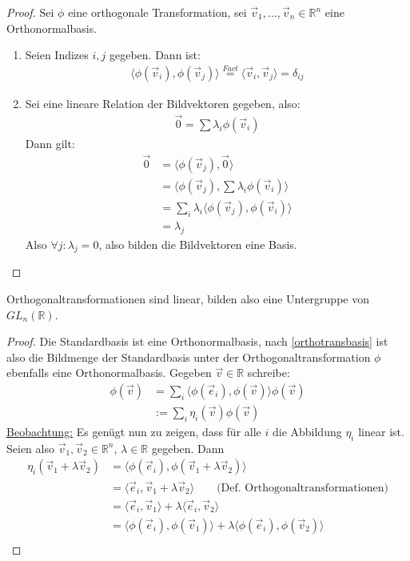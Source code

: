 \documentclass{report}
\newcommand{\ul}[1]{\underline{#1}}
\newcommand{\bR}{\mathbb{R}}
\newcommand{\ve}{\vec{e}}
\newcommand{\vv}{\vec{v}}
\newcommand{\vz}{\vec{0}}
\newcommand{\scalar}[2]{\langle #1, #2 \rangle}
\begin{document}
\begin{proof}
 Sei $\phi$ eine orthogonale Transformation, sei $\vv_1, \hdots, \vv_n \in \bR^n$ eine Orthonormalbasis.
 \begin{enumerate}
  \item Seien Indizes $i, j$ gegeben. Dann ist:
  \begin{align*}
   \scalar{\phi(\vv_i)}{\phi(\vv_j)} \overset{Fact}{=} \scalar{\vv_i}{\vv_j} = \delta_{ij}
  \end{align*}
  \item Sei eine lineare Relation der Bildvektoren gegeben, also:
  \begin{align*}
   \vz = \sum \lambda_i \phi(\vv_i)
  \end{align*}
  Dann gilt:
  \begin{align*}
   \vz &= \scalar{\phi(\vv_j)}{\vz}\\
       &= \scalar{\phi(\vv_j)}{\sum \lambda_i \phi(\vv_i)}\\
       &= \sum_i \lambda_i \scalar{\phi(\vv_j)}{\phi(\vv_i)}\\
       &= \lambda_j
  \end{align*}
  Also $\forall j : \lambda_j = 0$, also bilden die Bildvektoren eine Basis.
 \end{enumerate}
\end{proof}
\begin{konsequenz}
 Orthogonaltransformationen sind linear, bilden also eine Untergruppe von $GL_n(\bR)$.
\end{konsequenz}
\begin{proof}
 Die Standardbasis ist eine Orthonormalbasis, nach \ref{orthotransbasis} ist also die Bildmenge der Standardbasis unter der Orthogonaltransformation $\phi$ ebenfalls eine Orthonormalbasis. Gegeben $\vv \in \bR$ schreibe:
 \begin{align*}
  \phi(\vv) &= \sum_i \scalar{\phi(\ve_i)}{\phi(\vv)} \phi(\vv)\\
  &:= \sum_i \eta_i(\vv) \phi(\vv)
 \end{align*}
 \ul{Beobachtung:} Es genügt nun zu zeigen, dass für alle $i$ die Abbildung $\eta_i$ linear ist. Seien also $\vv_1, \vv_2 \in \bR^n$, $\lambda \in \bR$ gegeben. Dann
 \begin{align*}
  \eta_i (\vv_1 + \lambda \vv_2) &= \scalar{\phi(\ve_i)}{\phi(\vv_1 + \lambda \vv_2)}\\
  &= \scalar{\ve_i}{\vv_1 + \lambda \vv_2} \qquad\text{(Def. Orthogonaltransformationen)}\\
  &= \scalar{\ve_i}{\vv_1} + \lambda \scalar{\ve_i}{\vv_2}\\
  &= \scalar{\phi(\ve_i)}{\phi(\vv_1)} + \lambda \scalar{\phi(\ve_i)}{\phi(\vv_2)}\\
 \end{align*}
\end{proof}
\end{document}
